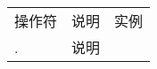\begin{table}
\begin{tabular}{|p{2cm}|p{6cm}|p{6cm}}
  操作符&说明&实例\\
  .&说明
\end{tabular}
\end{table}
